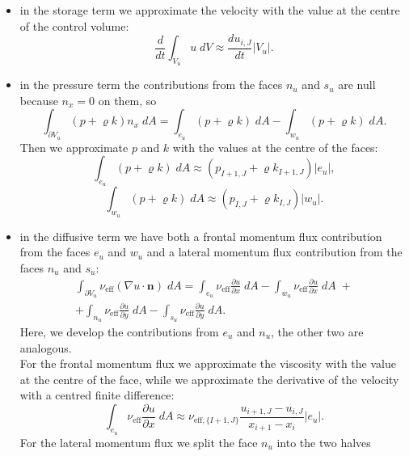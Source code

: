 \begin{itemize}
	\item in the storage term we approximate the velocity with the value at the 
	centre of the control volume:
	\begin{equation}
	\frac{d}{dt} \int_{V_u}  u\; dV \approx \frac{du_{i,J}}{dt}|V_u|.
	\end{equation}
	\item in the pressure term the contributions from the faces $n_u$ and $s_u$ 
	are null because $n_x=0$ on them, so 
	\begin{equation}
	\int_{\partial V_u} (p + \varrho k)n_x \; dA = \int_{e_u} (p+\varrho k) \; 
	dA - \int_{w_u} (p+\varrho k) \; dA.
	\end{equation}
	Then we approximate $p$ and $k$ with the values at the centre of the faces:
	\begin{equation}
	\int_{e_u} (p+\varrho k) \; dA \approx (p_{I+1,J} +\varrho k_{I+1,J}) |e_u|,
	\end{equation}
	\begin{equation}
	\int_{w_u} (p+\varrho k) \; dA \approx (p_{I,J} +\varrho k_{I,J}) |w_u|.
	\end{equation}
	\item in the diffusive term we have both a frontal momentum flux 
	contribution from the faces $e_u$ and $w_u$ and a lateral momentum flux 
	contribution from the faces $n_u$ and $s_u$:
	\begin{multline}
	\int_{\partial V_u} \nu_\text{eff} (\nabla u \cdot \mathbf{n}) \; dA =     
	\int_{e_u} \nu_\text{eff} \frac{\partial u}{\partial x} \; dA
	- \int_{w_u} \nu_\text{eff} \frac{\partial u}{\partial x} \; dA \;+\\
	+\int_{n_u} \nu_\text{eff} \frac{\partial u}{\partial y} \; dA
	- \int_{s_u} \nu_\text{eff} \frac{\partial u}{\partial y} \; dA.
	\end{multline}
	Here, we develop the contributions from $e_u$ and $n_u$, the other two are 
	analogous.\\	
	For the frontal momentum flux we approximate the viscosity with 
	the value at the centre of the face, while we approximate the derivative of 
	the velocity with a centred finite difference:
	\begin{equation}
	\int_{e_u} \nu_\text{eff} \frac{\partial u}{\partial x} \; dA \approx 
	\nu_{\text{eff},\{I+1,J\}} \frac{u_{i+1,J} - u_{i,J}}{x_{i+1}-x_i} |e_u|.
	\end{equation}
	For the lateral momentum flux we split the 	face $n_u$ into the two halves 

\end{itemize}
